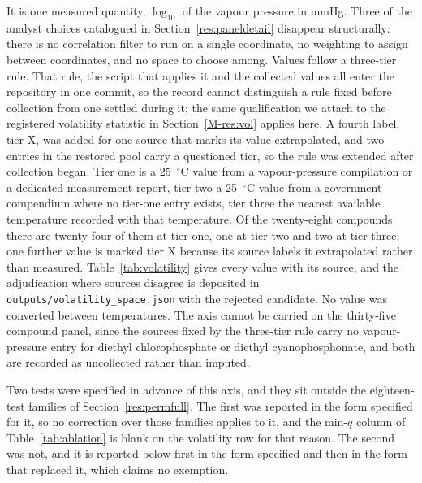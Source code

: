 \documentclass[11pt,a4paper]{article}
\begin{document}
It is one measured quantity, $\log_{10}$ of the vapour pressure in mmHg. Three
of the analyst choices catalogued in Section~\ref{res:paneldetail} disappear
structurally: there is no correlation filter to run on a single coordinate, no
weighting to assign between coordinates, and no space to choose among. Values
follow a three-tier rule. That rule, the script that applies it and the
collected values all enter the repository in one commit, so the record cannot
distinguish a rule fixed before collection from one settled during it; the
same qualification we attach to the registered volatility statistic in
Section~\ref{M-res:vol} applies here. A fourth label, tier X, was added for one
source that marks its value extrapolated, and two entries in the restored pool
carry a questioned tier, so the rule was extended after collection began.
Tier one is a
25~$^{\circ}$C value from a vapour-pressure compilation or a dedicated
measurement report, tier two a 25~$^{\circ}$C value from a government compendium
where no tier-one entry exists, tier three the nearest available temperature
recorded with that temperature. Of the twenty-eight compounds there are
twenty-four of them at tier one, one at tier two and two at tier three; one
further value is marked tier X because its source labels it extrapolated rather
than measured. Table~\ref{tab:volatility} gives every value with its source, and
the adjudication where sources disagree is deposited in
\texttt{outputs/volatility\_space.json} with the rejected candidate. No value was
converted between temperatures. The axis cannot be carried on the thirty-five
compound panel, since the sources fixed by the three-tier rule carry no
vapour-pressure entry for diethyl
chlorophosphate or diethyl cyanophosphonate, and both are recorded as
uncollected rather than imputed.

\begin{table}[htb]
  \centering
  \caption{Adopted vapour pressures for the twenty-eight-compound panel, in
  descending order. Tier records how the value was obtained; blank temperature
  means 25~$^{\circ}$C. Sources, rejected candidates and the adjudication where
  sources disagree are deposited in \texttt{outputs/volatility\_space.json}.}
  \label{tab:volatility}
  \small

\end{table}

Two tests were specified in advance of this axis, and they sit outside the
eighteen-test families of Section~\ref{res:permfull}. The first was reported in
the form specified for it, so no correction over those families applies to it,
and the min-$q$ column of Table~\ref{tab:ablation} is blank on the volatility
row for that reason. The second was not, and it is reported below first in the
form specified and then in the form that replaced it, which claims no
exemption.
\end{document}
